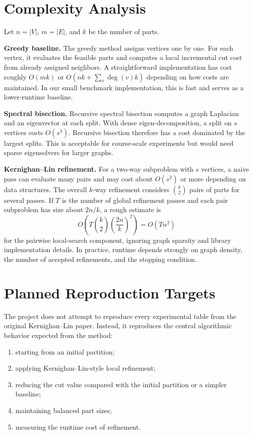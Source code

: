 \documentclass[11pt]{article}
\begin{document}
\section{Complexity Analysis}

Let $n=|V|$, $m=|E|$, and $k$ be the number of parts.

\textbf{Greedy baseline.}
The greedy method assigns vertices one by one. For each vertex, it evaluates
the feasible parts and computes a local incremental cut cost from already
assigned neighbors. A straightforward implementation has cost roughly
$O(mk)$ or $O(nk+\sum_v \deg(v)k)$ depending on how costs are maintained. In
our small benchmark implementation, this is fast and serves as a lower-runtime
baseline.

\textbf{Spectral bisection.}
Recursive spectral bisection computes a graph Laplacian and an eigenvector at
each split. With dense eigen-decomposition, a split on $s$ vertices costs
$O(s^3)$. Recursive bisection therefore has a cost dominated by the largest
splits. This is acceptable for course-scale experiments but would need sparse
eigensolvers for larger graphs.

\textbf{Kernighan--Lin refinement.}
For a two-way subproblem with $s$ vertices, a naive pass can evaluate many
pairs and may cost about $O(s^2)$ or more depending on data structures. The
overall $k$-way refinement considers $\binom{k}{2}$ pairs of parts for several
passes. If $T$ is the number of global refinement passes and each pair
subproblem has size about $2n/k$, a rough estimate is
\[
    O\left(T \binom{k}{2}\left(\frac{2n}{k}\right)^2\right)
    =
    O(Tn^2)
\]
for the pairwise local-search component, ignoring graph sparsity and library
implementation details. In practice, runtime depends strongly on graph density,
the number of accepted refinements, and the stopping condition.

\section{Planned Reproduction Targets}

The project does not attempt to reproduce every experimental table from the
original Kernighan--Lin paper. Instead, it reproduces the central algorithmic
behavior expected from the method:
\begin{enumerate}
    \item starting from an initial partition;
    \item applying Kernighan--Lin-style local refinement;
    \item reducing the cut value compared with the initial partition or a
    simpler baseline;
    \item maintaining balanced part sizes;
    \item measuring the runtime cost of refinement.
\end{enumerate}
\end{document}
